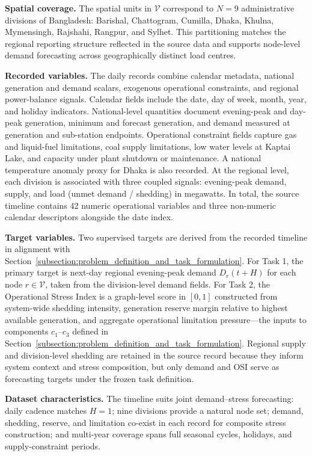 \textbf{Spatial coverage.} The spatial units in \(\mathcal{V}\) correspond to \(N = 9\) administrative divisions of Bangladesh: Barishal, Chattogram, Cumilla, Dhaka, Khulna, Mymensingh, Rajshahi, Rangpur, and Sylhet. This partitioning matches the regional reporting structure reflected in the source data and supports node-level demand forecasting across geographically distinct load centres.

\textbf{Recorded variables.} The daily records combine calendar metadata, national generation and demand scalars, exogenous operational constraints, and regional power-balance signals. Calendar fields include the date, day of week, month, year, and holiday indicators. National-level quantities document evening-peak and day-peak generation, minimum and forecast generation, and demand measured at generation and sub-station endpoints. Operational constraint fields capture gas and liquid-fuel limitations, coal supply limitations, low water levels at Kaptai Lake, and capacity under plant shutdown or maintenance. A national temperature anomaly proxy for Dhaka is also recorded. At the regional level, each division is associated with three coupled signals: evening-peak demand, supply, and load (unmet demand / shedding) in megawatts. In total, the source timeline contains 42 numeric operational variables and three non-numeric calendar descriptors alongside the date index.

\textbf{Target variables.} Two supervised targets are derived from the recorded timeline in alignment with Section~\ref{subsection:problem_definition_and_task_formulation}. For Task 1, the primary target is next-day regional evening-peak demand \(D_r(t+H)\) for each node \(r \in \mathcal{V}\), taken from the division-level demand fields. For Task 2, the Operational Stress Index is a graph-level score in \([0, 1]\) constructed from system-wide shedding intensity, generation reserve margin relative to highest available generation, and aggregate operational limitation pressure---the inputs to components \(c_1\)--\(c_3\) defined in Section~\ref{subsection:problem_definition_and_task_formulation}. Regional supply and division-level shedding are retained in the source record because they inform system context and stress composition, but only demand and OSI serve as forecasting targets under the frozen task definition.

\textbf{Dataset characteristics.} The timeline suits joint demand--stress forecasting: daily cadence matches \(H = 1\); nine divisions provide a natural node set; demand, shedding, reserve, and limitation co-exist in each record for composite stress construction; and multi-year coverage spans full seasonal cycles, holidays, and supply-constraint periods.

